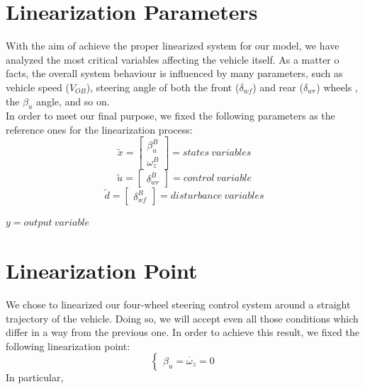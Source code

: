 \section{Linearization Parameters} 
	With the aim of achieve the proper linearized system for our model, we have analyzed the most critical variables affecting the vehicle itself. As a matter o facts, the overall system behaviour is influenced by many parameters, such as vehicle speed ($V_{OB}$), steering angle of both the front ($\delta_{wf}$) and rear ($\delta_{wr}$) wheels , the $\beta_{u}$ angle, and so on. \\
	In order to meet our final purpose, we fixed the following parameters as the reference ones for the linearization process:\\
		\begin{equation*}
			\tilde{x} =
			\begin{bmatrix}
			\beta_{u}^{B} \\\omega_{z}^{B}
			\end{bmatrix} = states \ variables
		\end{equation*}\quad
		\begin{equation*} 
			\tilde{u} =
			\begin{bmatrix}
			\delta_{wr}^{B} 
			\end{bmatrix} = control \ variable
		\end{equation*}\quad
		\begin{equation*} 
			\tilde{d} =
			\begin{bmatrix}
			\delta_{wf}^{B} 
			\end{bmatrix} = disturbance \ variables
		\end{equation*}
		\begin{center}
			$ y = output \ variable $	
		\end{center}
\section{Linearization Point} 
	We chose to linearized our four-wheel steering control system around a straight trajectory of the vehicle. Doing so, we will accept even all those conditions which differ in a way from the previous one. In order to achieve this result, we fixed the following linearization point:
		\begin{equation*}
			\begin{cases}
			\beta_{u} = \dot{\omega_{z}} = 0
			\end{cases}
		\end{equation*}
	In particular, 
